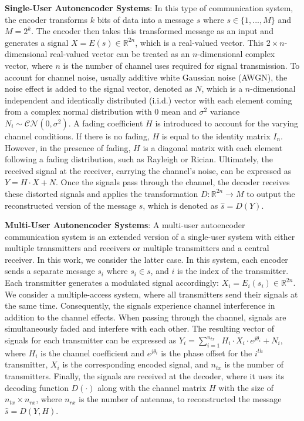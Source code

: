 \textbf{Single-User Autonencoder Systems}: In this type of communication system, the encoder transforms \(k\) bits of data into a message \(s\) where \(s \in \{1,...,M\}\) and \(M = 2^k\). The encoder then takes this transformed message as an input and generates a signal \(X = E(s) \in \mathbb{R}^{2n}\), which is a real-valued vector. This \(2 \times n\)-dimensional real-valued vector can be treated as an \(n\)-dimensional complex vector, where \(n\) is the number of channel uses required for signal transmission. To account for channel noise, usually additive white Gaussian noise (AWGN), the noise effect is added to the signal vector, denoted as \(N\), which is a \(n\)-dimensional independent and identically distributed (i.i.d.) vector with each element coming from a complex normal distribution with 0 mean and \(\sigma^2\) variance \(N_i \sim \mathcal{CN}(0, \sigma^2)\). A fading coefficient \(H\) is introduced to account for the varying channel conditions. If there is no fading, \(H\) is equal to the identity matrix \(I_n\). However, in the presence of fading, \(H\) is a diagonal matrix with each element following a fading distribution, such as Rayleigh or Rician. Ultimately, the received signal at the receiver, carrying the channel's noise, can be expressed as \(Y = H \cdot X + N\). Once the signals pass through the channel, the decoder receives these distorted signals and applies the transformation \(D: \mathbb{R}^{2n} \rightarrow M \) to output the reconstructed version of the message \(s\), which is  denoted as \(\hat{s} = D(Y)\).

\textbf{Multi-User Autonencoder Systems}: A multi-user autoencoder communication system is an extended version of a single-user system with either multiple transmitters and receivers or multiple transmitters and a central receiver. In this work, we consider the latter case. In this system, each encoder sends a separate message \(s_i\) where \(s_i \in s\), and \(i\) is the index of the transmitter. Each transmitter generates a modulated signal accordingly: \(X_i = E_i(s_i) \in \mathbb{R}^{2n}\). We consider a multiple-access system, where all transmitters send their signals at the same time. Consequently, the signals experience channel interference in addition to the channel effects. When passing through the channel, signals are simultaneously faded and interfere with each other. The resulting vector of signals for each transmitter can be expressed as \(Y_i = \sum_{i=1}^{n_{tx}} H_i \cdot X_i \cdot e^{j\theta_i} + N_i\), where \(H_i\) is the channel coefficient and \(e^{j\theta_i}\) is the phase offset for the \(i^{th}\) transmitter, \(X_i\) is the corresponding encoded signal, and \(n_{tx}\) is the number of transmitters. Finally, the signals are received at the decoder, where it uses its decoding function \(D(\cdot)\) along with the channel matrix \(H\) with the size of \(n_{tx} \times n_{rx}\), where \(n_{rx}\) is the number of antennas, to reconstructed the message \(\hat{s} = D(Y, H)\).